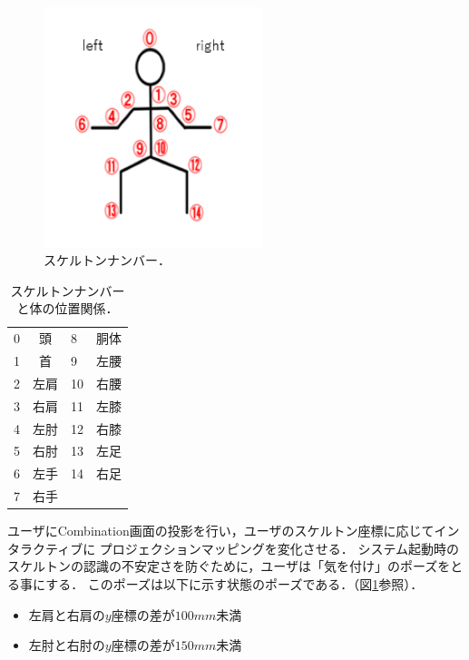 \begin{figure}[htbp]
    \centering
    \includegraphics[height=7cm]{image/Skeleton_num.png}
    \caption[スケルトンナンバー]{スケルトンナンバー．}
  \label{num}
\end{figure}

\begin{table}[h]
    \centering
    \begin{tabular}{|lc|lc|} \hline
      0 & 頭 & 8 & 胴体 \\ 
      1 & 首 & 9 & 左腰 \\
      2 & 左肩 & 10 & 右腰 \\
      3 & 右肩 & 11 & 左膝 \\
      4 & 左肘 & 12 & 右膝 \\
      5 & 右肘 & 13 & 左足 \\
      6 & 左手 & 14 & 右足 \\
      7 & 右手 &  &  \\ \hline
    \end{tabular}
    \caption[スケルトンナンバーと体の位置関係]{スケルトンナンバーと体の位置関係．}
    \label{num}
\end{table}



ユーザにCombination画面の投影を行い，ユーザのスケルトン座標に応じてインタラクティブに
プロジェクションマッピングを変化させる．
システム起動時のスケルトンの認識の不安定さを防ぐために，ユーザは「気を付け」のポーズをとる事にする．
このポーズは以下に示す状態のポーズである．（図\ref{num}参照）．

\begin{itemize}
    \item 左肩と右肩の$y$座標の差が$100mm$未満
    \item 左肘と右肘の$y$座標の差が$150mm$未満
\end{itemize}

